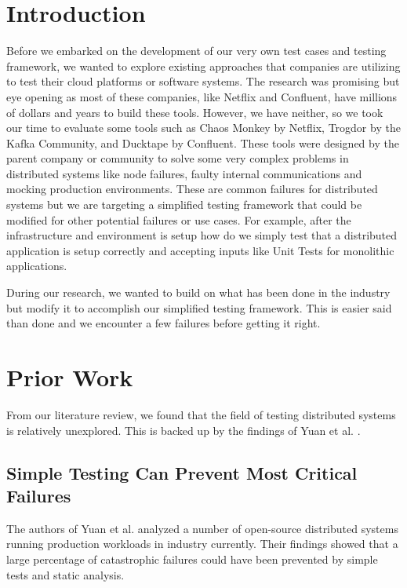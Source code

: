 \begin{multicols}{2}
\setlength{\columnsep}{1cm}

\section{Introduction}

Before we embarked on the development of our very own test cases and testing framework, we wanted to explore existing approaches that companies are utilizing to test their cloud platforms or software systems.
The research was promising but eye opening as most of these companies, like Netflix and Confluent, have millions of dollars and years to build these tools.
However, we have neither, so we took our time to evaluate some tools such as Chaos Monkey by Netflix, Trogdor by the Kafka Community, and Ducktape by Confluent.
These tools were designed by the parent company or community to solve some very complex problems in distributed systems like node failures, faulty internal communications and mocking production environments.
These are common failures for distributed systems but we are targeting a simplified testing framework that could be modified for other potential failures or use cases.
 For example, after the infrastructure and environment is setup how do we simply test that a distributed application is setup correctly and accepting inputs like Unit Tests for monolithic applications.

During our research, we wanted to build on what has been done in the industry but modify it to accomplish our simplified testing framework.
This is easier said than done and we encounter a few failures before getting it right.

\section{Prior Work}

From our literature review, we found that the field of testing distributed systems is relatively unexplored.
This is backed up by the findings of Yuan et al.
\cite{simpletesting}.

\subsection{Simple Testing Can Prevent Most Critical Failures}

The authors of Yuan et al.
analyzed a number of open-source distributed systems running production workloads in industry currently.
Their findings showed that a large percentage of catastrophic failures could have been prevented by simple tests and static analysis.


\end{multicols}
